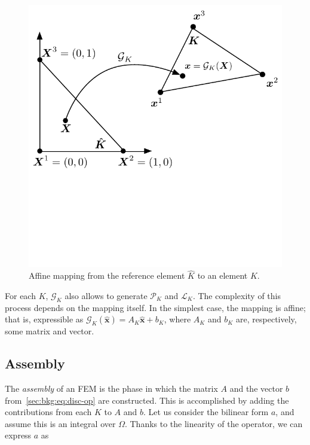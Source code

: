 \begin{figure}
\begin{CenteredBox}
\includegraphics[scale=0.8]{background/figures/reference-element}
\end{CenteredBox}
\caption{Affine mapping from the reference element $\hat{K}$ to an element $K$.}
\label{fig:bkg:reference-el}
\end{figure}

For each $K$, $\mathcal{G}_K$ also allows to generate $\mathcal{P}_K$ and $\mathcal{L}_K$.  The complexity of this process depends on the mapping itself. In the simplest case, the mapping is affine; that is, expressible as $\mathcal{G}_K(\hat{\boldsymbol{x}}) = A_K \hat{\boldsymbol{x}} + b_K$, where $A_K$ and $b_K$ are, respectively, some matrix and vector.


\subsection{Assembly}
\label{sec:bkg:assembly}
The {\em assembly} of an FEM is the phase in which the matrix $A$ and the vector $b$ from~\ref{sec:bkg:eq:disc-op} are constructed. This is accomplished by adding the contributions from each $K$ to $A$ and $b$. Let us consider the bilinear form $a$, and assume this is an integral over $\Omega$. Thanks to the linearity of the operator, we can express $a$ as

